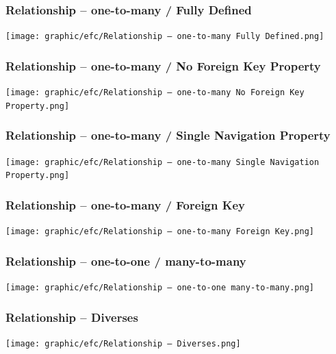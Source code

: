 \subsubsection{Relationship – one-to-many / Fully Defined}
\begin{center}
    \texttt{[image: graphic/efc/Relationship – one-to-many Fully Defined.png]}
\end{center}
\vspace{-8pt}

\subsubsection{Relationship – one-to-many / No Foreign Key Property}
\begin{center}
    \texttt{[image: graphic/efc/Relationship – one-to-many No Foreign Key Property.png]}
\end{center}
\vspace{-8pt}

\subsubsection{Relationship – one-to-many / Single Navigation Property}
\begin{center}
    \texttt{[image: graphic/efc/Relationship – one-to-many Single Navigation Property.png]}
\end{center}
\vspace{-8pt}

\subsubsection{Relationship – one-to-many / Foreign Key}
\begin{center}
    \texttt{[image: graphic/efc/Relationship – one-to-many Foreign Key.png]}
\end{center}
\vspace{-8pt}

\subsubsection{Relationship – one-to-one / many-to-many}
\begin{center}
    \texttt{[image: graphic/efc/Relationship – one-to-one many-to-many.png]}
\end{center}
\vspace{-8pt}

\subsubsection{Relationship – Diverses}
\begin{center}
    \texttt{[image: graphic/efc/Relationship – Diverses.png]}
\end{center}
\vspace{-8pt}

